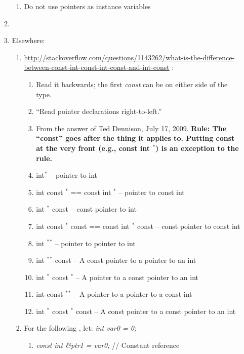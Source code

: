\begin{enumerate}
\begin{enumerate}
\begin{enumerate}
		\item Do not use pointers as instance variables
		\end{enumerate}
	\item \cite[Chp. 5--6; pp. 113--160]{Schildt1998a}
	\item Elsewhere: \vspace{-0.2cm}
		\begin{enumerate} \itemsep -2pt
		\item \url{http://stackoverflow.com/questions/1143262/what-is-the-difference-between-const-int-const-int-const-and-int-const} \cite{Mortensen2015}: \vspace{-0.1cm}
			\begin{enumerate} \itemsep -1pt
			\item Read it backwards; the first {\it const} can be on either side of the type.
			\item ``Read pointer declarations right-to-left.''
			\item From the answer of Ted Dennison, July 17, 2009. {\bf Rule: The ``const'' goes after the thing it applies to. Putting const at the very front (e.g., const int $^{\ast}$) is an exception to the rule.}
			\item int$^{\ast}$ -- pointer to int
			\item int const $^{\ast}$ == const int $^{\ast}$ -- pointer to const int
			\item int $^{\ast}$ const -- const pointer to int
			\item int const $^{\ast}$ const == const int $^{\ast}$ const -- const pointer to const int
			\item int $^{\ast}$$^{\ast}$ -- pointer to pointer to int
			\item int $^{\ast}$$^{\ast}$ const -- A const pointer to a pointer to an int
			\item int $^{\ast}$ const $^{\ast}$ -- A pointer to a const pointer to an int
			\item int const $^{\ast}$$^{\ast}$ -- A pointer to a pointer to a const int
			\item int $^{\ast}$ const $^{\ast}$ const -- A const pointer to a const pointer to an int
			\end{enumerate}
		\item For the following \cite{Mortensen2015}, let: {\it int var0 = 0;} \vspace{-0.1cm}
			\begin{enumerate} \itemsep -1pt
			\item {\it const int {\rm \&}ptr1 = var0;} // Constant reference

\end{enumerate}
\end{enumerate}
\end{enumerate}
\end{enumerate}
